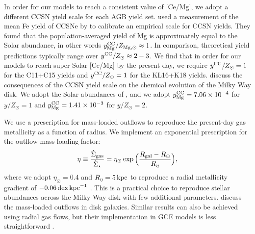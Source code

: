 \documentclass[twocolumn,twocolappendix]{aastex701}
\newcommand{\bracket}[2][H]{{\rm [#2/#1]}}
\newcommand{\kpc}{\,{\rm kpc}}
\newcommand{\dex}{\,{\rm dex}}
\newcommand{\Msun}{\,{\rm M}_\odot}
\begin{document}
In order for our models to reach a consistent value of [Ce/Mg], we adopt a different CCSN yield scale for each AGB yield set. 
\citet{weinberg_scale_2024} used a measurement of the mean Fe yield of CCSNe by \citet{rodriguez_iron_2023} to calibrate an empirical scale for CCSN yields. They found that the population-averaged yield of Mg is approximately equal to the Solar abundance, in other words $y_{\rm Mg}^{\rm CC}/Z_{\rm Mg,\odot}\approx1$. In comparison, theoretical yield predictions typically range over $y^{\rm CC}/Z_\odot\approx2-3$. We find that in order for our models to reach super-Solar [Ce/Mg] by the present day, we require $y^{\rm CC}/Z_\odot=1$ for the C11+C15 yields and $y^{\rm CC}/Z_\odot=1$ for the KL16+K18 yields. \citet{johnson_milky_2025} discuss the consequences of the CCSN yield scale on the chemical evolution of the Milky Way disk. We adopt the Solar abundances of \citet{asplund_chemical_2009}, and we adopt $y_{\rm Mg}^{\rm CC}=7.06\times10^{-4}$ for $y/Z_\odot=1$ and $y_{\rm Mg}^{\rm CC}=1.41\times10^{-3}$ for $y/Z_\odot=2$.

We use a prescription for mass-loaded outflows to reproduce the present-day gas metallicity as a function of radius. We implement an exponential prescription for the outflow mass-loading factor:
\begin{equation}
    \eta \equiv \frac{\dot\Sigma_{\rm gas}}{\dot\Sigma_\star} = \eta_\odot \exp\Big(\frac{R_{\rm gal}-R_\odot}{R_\eta}\Big),
\end{equation}
where we adopt $\eta_\odot=0.4$ and $R_\eta=5\kpc$ to reproduce a radial metallicity gradient of $-0.06\dex\kpc^{-1}$ \citep{mendez-delgado_gradients_2022}. This is a practical choice to reproduce stellar abundances across the Milky Way disk with few additional parameters. \citet{johnson_milky_2025} discuss the mass-loaded outflows in disk galaxies. Similar results can also be achieved using radial gas flows, but their implementation in GCE models is less straightforward \citep{johnson_constraints_2025}.
\end{document}
